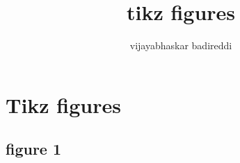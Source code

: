 \documentclass[12pt]{article}
\title{tikz figures}
\author{vijayabhaskar badireddi}
\begin{document}
\section*{Tikz figures}

\subsection*{figure 1}
\end{document}
